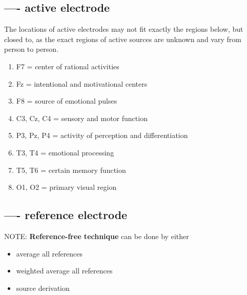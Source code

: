 \subsection{---- active electrode}
\label{sec:EEG-active-electrode}

The locations of active electrodes may not fit exactly the regions below, but
closed to, as the exact regions of  active sources are unknown and vary from person to
person.
\begin{enumerate}
  \item F7 = center of rational activities
  
  \item Fz = intentional and motivational centers
  
  \item F8 = source of emotional pulses
  
  \item C3, Cz, C4 = sensory and motor function
  
  \item P3, Pz, P4 = activity of perception and differentiation
  
  \item T3, T4 = emotional processing
  
  \item T5, T6 = certain memory function
  
  \item O1, O2 = primary visual region
\end{enumerate}



\subsection{---- reference electrode}
\label{sec:EEG-reference-electrode}

\begin{mdframed}
NOTE: {\bf Reference-free technique} can be done by either
\begin{itemize}
  \item average all references
  
  \item weighted average all references
  
  \item source derivation
\end{itemize}
\end{mdframed}

